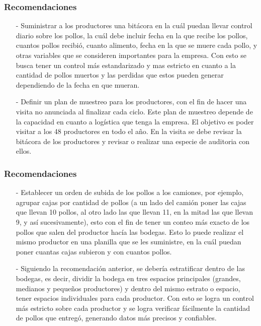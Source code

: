 \documentclass[11pt]{beamer}
\begin{document}
\begin{frame}
\frametitle{Recomendaciones}
\begin{itemize}
\justifying
\item[-]Suministrar a los productores una bitácora en la cuál puedan llevar control diario sobre los pollos, la cuál debe incluir fecha en la que recibe los pollos, cuantos pollos recibió, cuanto alimento, fecha en la que se muere cada pollo, y otras variables que se consideren importantes para la empresa. Con esto se busca tener un control más estandarizado y mas estricto en cuanto a la cantidad de pollos muertos y las perdidas que estos pueden generar dependiendo de la fecha en que mueran.
\item[-]Definir un plan de muestreo para los productores, con el fin de hacer una visita no anunciada al finalizar cada ciclo. Este plan de muestreo depende de la capacidad en cuanto a logística que tenga la empresa. El objetivo es poder visitar a los 48 productores en todo el año. En la visita se debe revisar la bitácora de los productores y revisar o realizar una especie de auditoria con ellos. 
\end{itemize}
\end{frame}

\begin{frame}
\frametitle{Recomendaciones}
\begin{itemize}
\justifying
\item[-]Establecer un orden de subida de los pollos a los camiones, por ejemplo, agrupar cajas por cantidad de pollos (a un lado del camión poner las cajas que llevan 10 pollos, al otro lado las que llevan 11, en la mitad las que llevan 9, y así sucesivamente), esto con el fin de tener un conteo más exacto de los pollos que salen del productor hacía las bodegas. Esto lo puede realizar el mismo productor en una planilla que se les suministre, en la cuál puedan poner cuantas cajas subieron y con cuantos pollos.
\item[-]Siguiendo la recomendación anterior, se debería estratificar dentro de las bodegas, es decir, dividir la bodega en tres espacios principales (grandes, medianos y pequeños productores) y dentro del mismo estrato o espacio, tener espacios individuales para cada productor. Con esto se logra un control más estricto sobre cada productor y se logra verificar fácilmente la cantidad de pollos que entregó, generando datos más precisos y confiables.
\end{itemize}
\end{frame}
\end{document}
